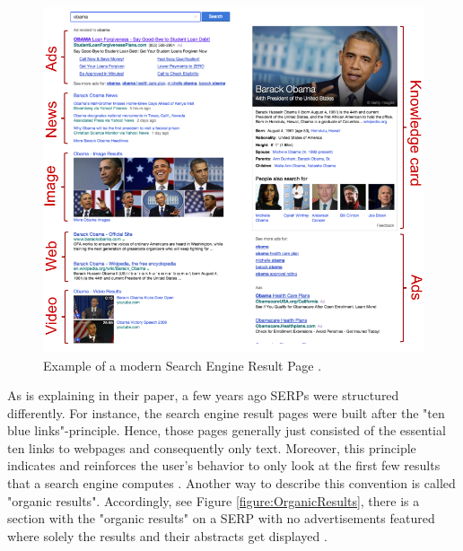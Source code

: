 \begin{figure}[!ht]
    \centering
    \includegraphics[width=1\linewidth]{images/SERP_wang2016beyond.png}
    \caption{
        Example of a modern Search Engine Result Page \autocite[104]{wang2016beyond}.
    }
    \label{figure:ModernSerp}
\end{figure}

As \textcite{lewandowski2015evaluating} is explaining in their paper, a few years ago SERPs were structured differently. For instance, the search engine result pages were built after the "ten blue links"-principle. Hence, those pages generally just consisted of the essential ten links to webpages and consequently only text. Moreover, this principle indicates and reinforces the user's behavior to only look at the first few results that a search engine computes \autocite{lewandowski2015evaluating, liu2015influence, wang2016beyond}. Another way to describe this convention is called "organic results". Accordingly, see Figure \ref{figure:OrganicResults}, there is a section with the "organic results" on a SERP with no advertisements featured where solely the results and their abstracts get displayed \autocite{buscher2010good}.

